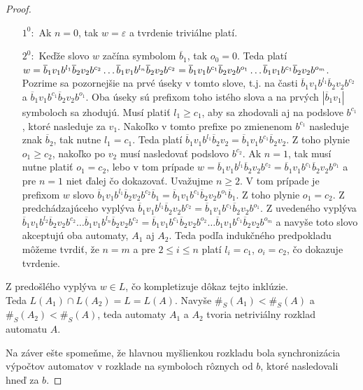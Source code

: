 \begin{proof}
\begin{enumerate}
\begin{itemize}
    \item [$ 1^0: $] Ak $ n=0 $, tak $ w = \varepsilon $ a tvrdenie triviálne platí.
    \item [$ 2^0: $] Keďže slovo $ w $ začína symbolom $ \overline{b}_1 $, tak $ o_0 = 0 $. Teda platí $ w = \overline{b}_1v_1b^{l_1}\overline{b}_2v_2b^{c_2} \ldots \\ \overline{b}_1v_1b^{l_n}\overline{b}_2v_2b^{c_2} = \overline{b}_1v_1b^{c_1}\overline{b}_2v_2b^{o_1} \ldots \overline{b}_1v_1b^{c_1}\overline{b}_2v_2b^{o_m} $. Pozrime sa pozornejšie na prvé úseky v tomto slove, t.j. na časti $ \overline{b}_1v_1b^{l_1}\overline{b}_2v_2b^{c_2} $ a $ \overline{b}_1v_1b^{c_1}\overline{b}_2v_2b^{o_1} $. Oba úseky sú prefixom toho istého slova a na prvých $ |\overline{b}_1v_1| $ symboloch sa zhodujú. Musí platiť $ l_1 \geq c_1 $, aby sa zhodovali aj na podslove $ b^{c_1} $, ktoré nasleduje za $ v_1 $. Nakoľko v tomto prefixe po zmienenom $ b^{c_1} $ nasleduje znak $ \overline{b}_2 $, tak nutne $ l_1 = c_1 $. Teda platí $ \overline{b}_1v_1b^{l_1}\overline{b}_2v_2 = \overline{b}_1v_1b^{c_1}\overline{b}_2v_2 $. Z toho plynie $ o_1 \geq c_2 $, nakoľko po $ v_2 $ musí nasledovať podslovo $ b^{c_2} $. Ak $ n = 1 $, tak musí nutne platiť $ o_1 = c_2 $, lebo v tom prípade $ w = \overline{b}_1v_1b^{l_1}\overline{b}_2v_2b^{c_2} = \overline{b}_1v_1b^{c_1}\overline{b}_2v_2b^{o_1} $ a pre $ n=1 $ niet ďalej čo dokazovať. Uvažujme $ n \geq 2 $. V tom prípade je prefixom $ w $ slovo $ \overline{b}_1v_1b^{l_1}\overline{b}_2v_2b^{c_2}\overline{b}_1 = \overline{b}_1v_1b^{c_1}\overline{b}_2v_2b^{o_1}\overline{b}_1 $. Z toho plynie $ o_1 = c_2 $. Z predchádzajúceho vyplýva $ \overline{b}_1v_1b^{l_1}\overline{b}_2v_2b^{c_2} = \overline{b}_1v_1b^{c_1}\overline{b}_2v_2b^{o_1} $. Z uvedeného vyplýva $ \overline{b}_1v_1b^{l_2}\overline{b}_2v_2b^{c_2} \ldots \overline{b}_1v_1b^{l_n}\overline{b}_2v_2b^{c_2} = \overline{b}_1v_1b^{c_1}\overline{b}_2v_2b^{o_2} \ldots \overline{b}_1v_1b^{c_1}\overline{b}_2v_2b^{o_m} $ a navyše toto slovo akceptujú oba automaty, $ A_1 $ aj $ A_2 $. Teda podľa indukčného predpokladu môžeme tvrdiť, že $ n = m $ a pre $ 2 \leq i \leq n $ platí $ l_i = c_1 $, $ o_i = c_2 $, čo dokazuje tvrdenie.
\end{itemize}

Z predošlého vyplýva $ w \in L $, čo kompletizuje dôkaz tejto inklúzie. \\
Teda $ L(A_1) \cap L(A_2) = L = L(A) $. Navyše $ \#_S(A_1) < \#_S(A) $ a $ \#_S(A_2) < \#_S(A) $, teda automaty $ A_1 $ a $ A_2 $ tvoria netriviálny rozklad automatu $ A $.
\end{enumerate}

Na záver ešte spomeňme, že hlavnou myšlienkou rozkladu bola \glqq{}synchronizácia\grqq{} výpočtov automatov v rozklade na symboloch rôznych od $ b $, ktoré nasledovali hneď za $ b $.
\end{proof}

